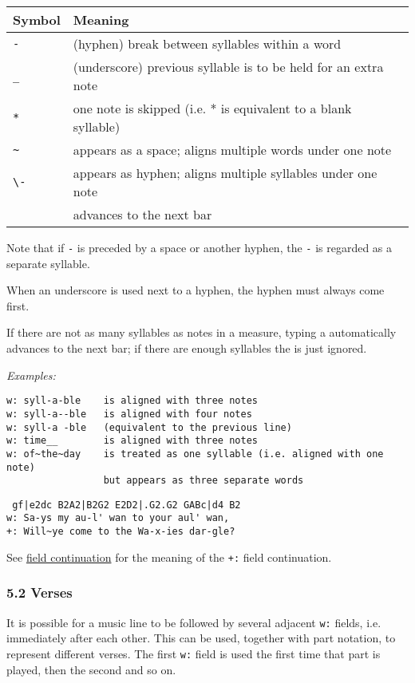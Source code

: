 \begin{longtable}[]{@{}ll@{}}
\toprule
\textbf{Symbol} & \textbf{Meaning}\tabularnewline
\midrule
\endhead
\texttt{-} & (hyphen) break between syllables within a
word\tabularnewline
\texttt{\_} & (underscore) previous syllable is to be held for an extra
note\tabularnewline
\texttt{*} & one note is skipped (i.e. * is equivalent to a blank
syllable)\tabularnewline
\texttt{\textasciitilde{}} & appears as a space; aligns multiple words
under one note\tabularnewline
\texttt{\textbackslash{}-} & appears as hyphen; aligns multiple
syllables under one note\tabularnewline
\texttt{\textbar{}} & advances to the next bar\tabularnewline
\bottomrule
\end{longtable}

Note that if \texttt{-} is preceded by a space or another hyphen, the
\texttt{-} is regarded as a separate syllable.

When an underscore is used next to a hyphen, the hyphen must always come
first.

If there are not as many syllables as notes in a measure, typing a
\texttt{\textbar{}} automatically advances to the next bar; if there are
enough syllables the \texttt{\textbar{}} is just ignored.

\emph{Examples:}

\begin{verbatim}
w: syll-a-ble    is aligned with three notes
w: syll-a--ble   is aligned with four notes
w: syll-a -ble   (equivalent to the previous line)
w: time__        is aligned with three notes
w: of~the~day    is treated as one syllable (i.e. aligned with one note)
                 but appears as three separate words
\end{verbatim}

\begin{verbatim}
 gf|e2dc B2A2|B2G2 E2D2|.G2.G2 GABc|d4 B2
w: Sa-ys my au-l' wan to your aul' wan,
+: Will~ye come to the Wa-x-ies dar-gle?
\end{verbatim}

See \protect\hyperlink{field_continuation}{field continuation} for the
meaning of the \texttt{+:} field continuation.

\hypertarget{verses}{\subsubsection{5.2 Verses}\label{verses}}

It is possible for a music line to be followed by several adjacent
\texttt{w:} fields, i.e. immediately after each other. This can be used,
together with part notation, to represent different verses. The first
\texttt{w:} field is used the first time that part is played, then the
second and so on.

